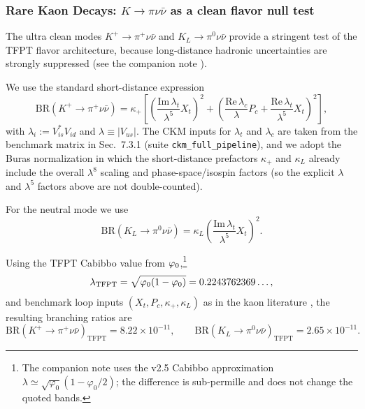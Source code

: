 \TFPTCKMMatrixBlock

\TFPTYukawaTextureBlock

\TFPTYukawaHeatmapPlot

\subsubsection{Rare Kaon Decays: $K\to\pi\nu\bar{\nu}$ as a clean flavor null test}
\label{sec:rare-kaon}

The ultra clean modes $K^+ \to \pi^+ \nu\bar{\nu}$ and $K_L \to \pi^0 \nu\bar{\nu}$ provide
a stringent test of the TFPT flavor architecture, because long-distance hadronic uncertainties
are strongly suppressed (see the companion note \cite{rareKaonNote2025}).

We use the standard short-distance expression
\begin{equation}
\mathrm{BR}(K^+ \to \pi^+ \nu\bar{\nu}) =
\kappa_+\left[
\left(\frac{\mathrm{Im}\,\lambda_t}{\lambda^5}X_t\right)^2+
\left(\frac{\mathrm{Re}\,\lambda_c}{\lambda}P_c+\frac{\mathrm{Re}\,\lambda_t}{\lambda^5}X_t\right)^2
\right],
\end{equation}
with $\lambda_i := V_{is}^\ast V_{id}$ and $\lambda \equiv |V_{us}|$. The CKM inputs for
$\lambda_t$ and $\lambda_c$ are taken from the benchmark matrix in Sec.~7.3.1
(suite \texttt{ckm\_full\_pipeline}), and we adopt the Buras normalization in which the
short-distance prefactors $\kappa_+$ and $\kappa_L$ already include the overall $\lambda^8$
scaling and phase-space/isospin factors (so the explicit $\lambda$ and $\lambda^5$ factors
above are not double-counted).

For the neutral mode we use
\begin{equation}
\mathrm{BR}(K_L \to \pi^0 \nu\bar{\nu}) =
\kappa_L\left(\frac{\mathrm{Im}\,\lambda_t}{\lambda^5}X_t\right)^2.
\end{equation}

Using the TFPT Cabibbo value from $\varphi_0$,\footnote{The companion note
\cite{rareKaonNote2025} uses the v2.5 Cabibbo approximation
$\lambda \simeq \sqrt{\varphi_0}(1-\varphi_0/2)$; the difference is sub-permille and does not
change the quoted bands.}
\begin{equation}
\lambda_{\mathrm{TFPT}}=\sqrt{\varphi_0(1-\varphi_0)}=0.2243762369\ldots,
\end{equation}
and benchmark loop inputs $(X_t,P_c,\kappa_+,\kappa_L)$ as in the kaon literature
\cite{brod2021,buras2022,na622024},
the resulting branching ratios are
\begin{equation}
\mathrm{BR}(K^+ \to \pi^+ \nu\bar{\nu})_{\mathrm{TFPT}} = 8.22\times 10^{-11},
\qquad
\mathrm{BR}(K_L \to \pi^0 \nu\bar{\nu})_{\mathrm{TFPT}} = 2.65\times 10^{-11}.
\end{equation}


